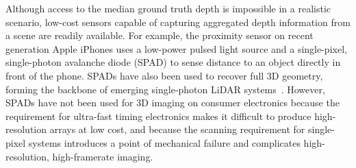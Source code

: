 







Although access to the median ground truth depth is impossible in a realistic
scenario, low-cost sensors capable of capturing aggregated depth information
from a scene are readily available. For example, the proximity sensor on recent
generation Apple iPhones uses a low-power pulsed light source and a
single-pixel, single-photon avalanche diode (SPAD) to sense distance to an
object directly in front of the phone. SPADs have also been used to recover full
3D geometry, forming the backbone of emerging single-photon LiDAR
systems~\cite{Kirmani:2014,Li:2019,pawlikowska2017single}. However, SPADs have
not been used for 3D imaging on consumer electronics because the requirement for
ultra-fast timing electronics makes it difficult to produce high-resolution
arrays at low cost, and because the scanning requirement for single-pixel
systems introduces a point of mechanical failure and complicates
high-resolution, high-framerate imaging.



